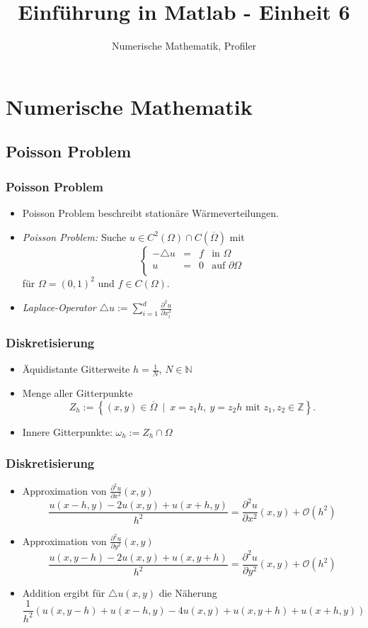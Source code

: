 \documentclass[hyperref={xetex}]{beamer}
\title{Einführung in Matlab - Einheit 6}
\subtitle{Numerische Mathematik, Profiler}
\begin{document}
\titlepage

\section{Numerische Mathematik}

\subsection{Poisson Problem}
%
% 
\begin{frame}[fragile]\frametitle{Poisson Problem}
\begin{itemize}
\item Poisson Problem beschreibt station\"are W\"armeverteilungen.
\item {\it Poisson Problem:} Suche  $u \in
C^2(\Omega)\cap C(\overline{\Omega})$ mit
\[
\left \{ \begin{array}{rcll}
- \triangle u & = & f & \mbox{in } \Omega\\
u & = & 0 & \mbox{auf } \partial \Omega\\ 
\end{array} \right.
\]
f\"ur $\Omega=(0,1)^2$ und $f \in C(\Omega)$.
\item  {\it Laplace-Operator} 
$ \triangle u := \sum_{i=1}^d \frac{\partial ^2 u}{\partial x_i^2} $
\end{itemize}
\end{frame}
%
% 
\begin{frame}[fragile]\frametitle{Diskretisierung}
\begin{itemize}
\item \"Aquidistante Gitterweite $h= \frac 1 N$,
$N \in \mathbb{N}$
\item Menge aller Gitterpunkte 
\[ Z_h := \left\{ (x,y) \in \overline{\Omega} \ \mid \ x=z_1h, \ y=z_2h \text{ mit }
z_1,z_2 \in \mathbb{Z} \right\}. \]
\item Innere Gitterpunkte: $\omega_h := Z_h \cap \Omega$
\end{itemize}
\end{frame}
%
% 
\begin{frame}[fragile]\frametitle{Diskretisierung}
\begin{itemize}
\item Approximation von $ \frac{\partial ^2 u}{\partial
  x^2} (x,y)$
{\small \[ \frac{u(x -h,y) - 2 u(x,y) + u(x+h,y)}{h^2} = \frac{\partial ^2 u}{\partial
  x^2} (x,y) + \mathcal{O}(h^2) \]}
\item  Approximation von $ \frac{\partial ^2 u}{\partial
  y^2} (x,y)$
{\small \[ \frac{u(x ,y-h) - 2 u(x,y) + u(x,y+h)}{h^2} = \frac{\partial ^2 u}{\partial
  y^2} (x,y) + \mathcal{O}(h^2) \]}
\item Addition ergibt f\"ur $ \triangle u(x,y)$ die N\"aherung
{\footnotesize \[
 \frac{1}{h^2} \left( u(x,y-h) + u(x-h,y) - 4 u(x,y) + u(x,y+h) +
 u(x+h,y)  \right) 
\] }
\end{itemize}
\end{frame}
\end{document}
